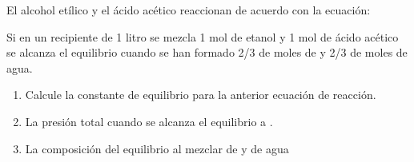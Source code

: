 \begin{exerciseEVAU}
    El alcohol etílico y el ácido acético reaccionan de acuerdo con la ecuación:
    \begin{center}
    \end{center}
    Si en un recipiente de 1 litro se mezcla 1 mol de etanol y 1 mol de ácido acético se alcanza el equilibrio cuando se han formado 2/3 de moles de  y 2/3 de moles de agua.
    \begin{enumerate}[label=\letraminuscula]
\item Calcule la constante de equilibrio para la anterior ecuación de reacción.
\item La presión total cuando se alcanza el equilibrio a .
\item La composición del equilibrio al mezclar  de  y  de agua
    \end{enumerate}


\end{exerciseEVAU}
